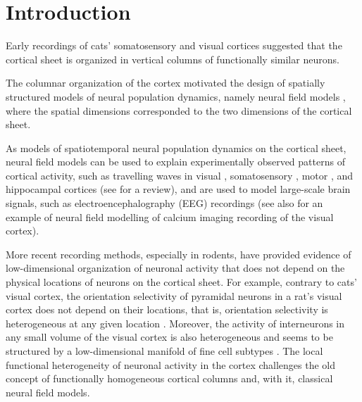 \documentclass[10pt,letterpaper]{article}
\begin{document}
\linenumbers


\section{Introduction}



Early recordings of cats' somatosensory \cite{Mou57} and visual \cite{HubWie62} cortices suggested that the cortical sheet is organized in vertical columns of functionally similar neurons.

The columnar organization of the cortex motivated the design of spatially structured models of neural population dynamics, namely neural field models \cite{WilCow73,Nun74,Ama77}, where the spatial dimensions corresponded to the two dimensions of the cortical sheet. 

As models of spatiotemporal neural population dynamics on the cortical sheet, neural field models can be used to explain experimentally observed patterns of cortical activity, such as travelling waves in visual \cite{SatNau12,MulRey14}, somatosensory \cite{PetHah03,FerBol06}, motor \cite{RubRob06,TakKim15}, and hippocampal \cite{LubSia09,PatFuj12,PatSch13} cortices (see \cite{MulCha18} for a review), and are used to model large-scale brain signals, such as electroencephalography (EEG) recordings \cite{Bre17} (see also \cite{DipRan18} for an example of neural field modelling of calcium imaging recording of the visual cortex).

More recent recording methods, especially in rodents, have provided evidence of low-dimensional organization of neuronal activity that does not depend on the physical locations of neurons on the cortical sheet. For example, contrary to cats' visual cortex, the orientation selectivity of pyramidal neurons in a rat's visual cortex does not depend on their locations, that is, orientation selectivity is heterogeneous at any given location \cite{OhkChu05}. Moreover, the activity of interneurons in any small volume of the visual cortex is also heterogeneous and seems to be structured by a low-dimensional manifold of fine cell subtypes \cite{BugDuf22}. The local functional heterogeneity of neuronal activity in the cortex challenges the old concept of functionally homogeneous cortical columns and, with it, classical neural field models. 
\end{document}

